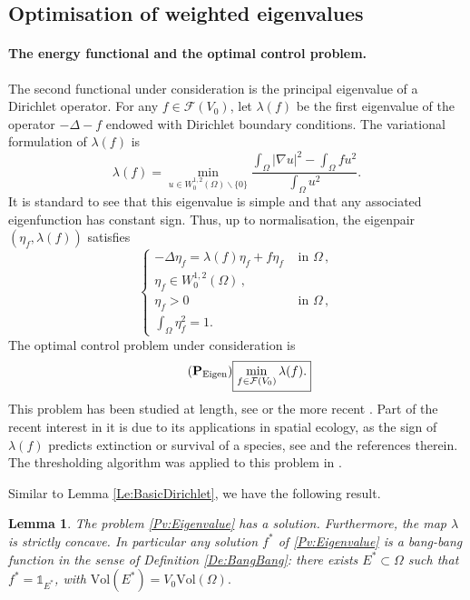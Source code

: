 \documentclass{article}
\newtheorem{lemma}[material]{Lemma}
\def\O{{\Omega}}
\def\n{{\nabla}}
\numberwithin{equation}{section}
\begin{document}
\subsection{Optimisation of weighted eigenvalues}\label{Se:IntroEigenvalue}
\paragraph{The energy functional and the optimal control problem.}
The second functional under consideration is the principal eigenvalue of a Dirichlet operator. For any $f\in \mathcal F(V_0)$, let $\lambda(f)$ be the first eigenvalue of the operator $-\Delta-f$ endowed with Dirichlet boundary conditions. The variational formulation of $\lambda(f)$ is
\begin{equation}\label{Eq:Rayleigh}
\lambda(f)=\min_{u\in W^{1,2}_0(\O)\backslash\{0\}}\frac{\int_\O|\n u|^2-\int_\O fu^2 }{\int_\O u^2}.\end{equation} It is standard to see that this eigenvalue is simple and that any associated eigenfunction has constant sign. Thus, up to normalisation, the eigenpair $(\eta_f,\lambda(f))$ satisfies
\begin{equation}
\label{Eq:Eigenpair}
\begin{cases}
-\Delta \eta_f=\lambda(f)\eta_f+f\eta_f&\text{ in }\O\,, 
\\ \eta_f\in W^{1,2}_0(\O)\,, 
\\ \eta_f>0&\text{ in }\O\,, 
\\ \int_\O \eta_f^2=1.
\end{cases}
\end{equation}
The optimal control problem under consideration is 
\begin{equation}\label{Pv:Eigenvalue}\tag{$\bold{P}_{\mathrm{Eigen}}$}
\fbox{$\displaystyle \min_{f\in \mathcal F(V_0)}\lambda(f).
$}
\end{equation}
This problem has been studied at length, see \cite[Chapter 8]{henrot2006} or the more recent \cite{LLNP}. Part of the recent interest in it is due to its applications in spatial ecology, as the sign of $\lambda(f)$ predicts extinction or survival of a species, see \cite[Introduction]{MazariThese} and the references therein. The thresholding algorithm was applied to this problem in \cite{HintermullerKaoLaurain,KaoLouYanagida,LLNP}.

Similar to Lemma \ref{Le:BasicDirichlet}, we have the following result.

\begin{lemma}\label{Le:BasicEigenv}
The problem \eqref{Pv:Eigenvalue} has a solution. Furthermore, the map $\lambda$ is strictly concave. In particular any solution $f^*$ of \eqref{Pv:Eigenvalue} is a bang-bang function in the sense of Definition \ref{De:BangBang}: there exists $E^*\subset \O$ such that $f^*=\mathds 1_{E^*}$, with $\mathrm{Vol}(E^*)=V_0\mathrm{Vol}(\O).$ 
\end{lemma}
\end{document}
